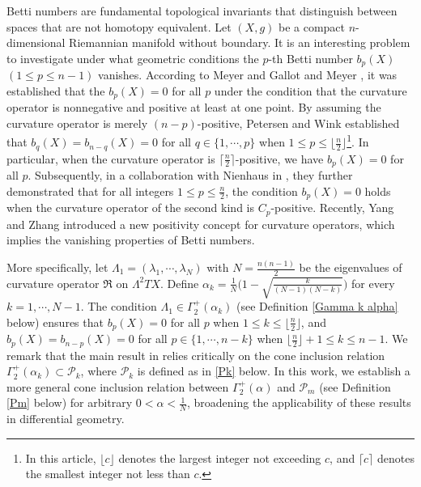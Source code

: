 \documentclass[12pt, twoside]{article}
\theoremstyle{definition}
\numberwithin{equation}{section}
\begin{document}
Betti numbers are fundamental topological invariants that distinguish between spaces that are not homotopy equivalent. Let $(X,g)$ be a compact $n$-dimensional Riemannian manifold without boundary.  It is an interesting problem to investigate under what geometric conditions the $p$-th Betti number $b_{p}(X)$ $(1\leq p\leq n-1)$ vanishes. According to  Meyer \cite{Mey71} and Gallot and Meyer \cite{GM75}, it was established that the $b_{p}(X)=0$  for all $p$ under the condition that the curvature operator is nonnegative and positive at least at one point.  By assuming the curvature operator is merely $(n-p)$-positive, Petersen and Wink \cite{PW21a} established that $b_{q}(X)=b_{n-q}(X)=0$ for all $q\in \{1,\cdots,p\}$ when $1\leq p\leq \lfloor \frac{n}{2}\rfloor$\footnote{In this article, $\lfloor c\rfloor$ denotes the largest integer not exceeding $c$, and $\lceil c\rceil$ denotes the smallest integer not less than $c$.}. In particular, when the curvature operator is $\lceil \frac{n}{2} \rceil$-positive, we have $b_{p}(X)=0$ for all $p$. Subsequently, in a collaboration with Nienhaus in \cite{NPW23}, they further demonstrated that  for all integers $1\leq p\leq \frac{n}{2}$, the condition $b_{p}(X)=0$ holds when the curvature operator of the second kind is $C_{p}$-positive.  Recently, Yang and Zhang \cite{YZ25} introduced a new positivity concept for curvature operators, which implies the vanishing properties of Betti numbers. 

More specifically, let $\Lambda_{1}=(\lambda_{1},\cdots,\lambda_{N})$ with $N=\frac{n(n-1)}{2}$ be the eigenvalues of curvature operator $\mathfrak{R}$ on $\Lambda^2TX$. Define $\alpha_{k}=\frac{1}{N}\big(1-\sqrt{\frac{k}{(N-1)(N-k)}}\big)$ for every $k=1,\cdots,N-1$. The condition $\Lambda_1\in \Gamma_{2}^{+}(\alpha_{k})$ (see Definition \ref{Gamma k alpha} below) ensures that $b_{p}(X)=0$ for all $p$ when $1\leq k\leq \lfloor \frac{n}{2}\rfloor$, and  $b_{p}(X)=b_{n-p}(X)=0$ for all $p\in \{1,\cdots,n-k\}$ when  $\lfloor \frac{n}{2}\rfloor+1 \leq k\leq n-1$. We remark that the main result in \cite{YZ25} relies critically on the cone inclusion relation $\Gamma_{2}^{+}(\alpha_{k}) \subset \mathcal{P}_{k}$, where  $\mathcal{P}_{k}$ is defined as in \eqref{Pk} below.  In this work, we  establish a more general cone inclusion relation between $\Gamma_{2}^{+}(\alpha)$ and $\mathcal{P}_{m}$ (see Definition \ref{Pm} below) for arbitrary $0<\alpha<\frac{1}{N}$, broadening the applicability of these results in differential geometry. 
\end{document}
